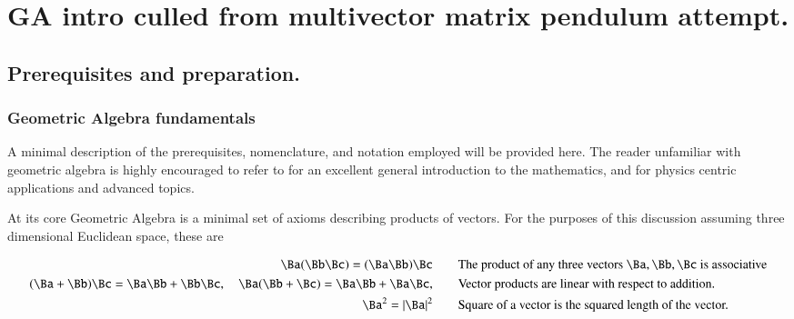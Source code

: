 %

\chapter{GA intro culled from multivector matrix pendulum attempt.}
\label{chap:gaMintro}
{}
\date{Nov 26, 2009}

\beginArtWithToc

\section{Prerequisites and preparation.}

\subsection{Geometric Algebra fundamentals}

A minimal description of the prerequisites, nomenclature, and notation employed will be provided here.  The reader unfamiliar with geometric algebra is highly encouraged to refer to \cite{dorst2007gac} for an excellent general introduction to the mathematics, and \cite{doran2003gap} for physics centric applications and advanced topics.

At its core Geometric Algebra is a minimal set of axioms describing products of vectors.  For the purposes of this discussion assuming three dimensional Euclidean space, these are

\begin{axiom}
\begin{subequations}\label{axiom:gaMintro:all}
\begin{align}
\Ba (\Bb \Bc) = (\Ba \Bb) \Bc & \qquad \mbox{The product of any three vectors $\Ba,\Bb,\Bc$ is associative} \\
(\Ba + \Bb) \Bc = \Ba \Bb + \Bb \Bc, \quad
\Ba (\Bb + \Bc) = \Ba \Bb + \Ba \Bc,
 & \qquad \mbox{Vector products are linear with respect to addition.} \\
\Ba^2 = \Abs{\Ba}^2 & \qquad \mbox{Square of a vector is the squared length of the vector.} \label{axiom:gaMintro:contraction}
\end{align}
\end{subequations}
\end{axiom}

